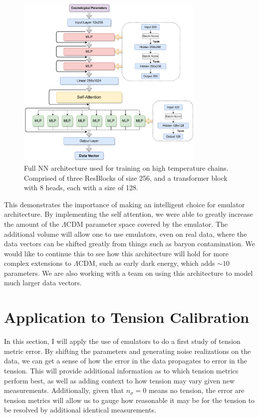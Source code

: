 \begin{figure}[!tb]
	\centering
	\includegraphics[width=0.8\textwidth]{plots/Untitled Diagram.drawio-5.pdf}
	\caption{Full NN architecture used for training on high temperature chains. Comprised of three ResBlocks of size 256, and a transformer block with 8 heads, each with a size of 128.}
	\label{fig:full_arch}
\end{figure}

This demonstrates the importance of making an intelligent choice for emulator architecture. By implementing the self attention, we were able to greatly increase the amount of the $\Lambda$CDM parameter space covered by the emulator. The additional volume will allow one to use emulators, even on real data, where the data vectors can be shifted greatly from things such as baryon contamination. We would like to continue this to see how this architecture will hold for more complex extensions to $\Lambda$CDM, such as early dark energy, which adds $\sim10$ parameters. We are also working with a team on using this architecture to model much larger data vectors.

\section{Application to Tension Calibration}
In this section, I will apply the use of emulators to do a first study of tension metric error. By shifting the parameters and generating noise realizations on the data, we can get a sense of how the error in the data propagates to error in the tension. This will provide additional information as to which tension metrics perform best, as well as adding context to how tension may vary given new measurements. Additionally, given that $n_\sigma=0$ means no tension, the error are tension metrics will allow us to gauge how reasonable it may be for the tension to be resolved by additional identical measurements.

